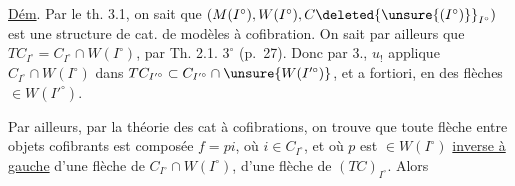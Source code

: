 
\uline{Dém}. Par le th. 3.1, on sait que $(M(I^\circ),W(I^\circ),C\deleted{\unsure{(I^\circ)}}_{I^\circ})$ est une structure de cat. de modèles à cofibration. On sait par ailleurs que $TC_{I^\circ}=C_{I^\circ}\cap W(I^\circ)$, par Th. 2.1. $3^\circ$ (p.~27). Donc par 3., $u_!$ applique $C_{I^\circ}\cap W(I^\circ)$ dans $TC_{I'^\circ}\subset C_{I'^\circ}\cap\unsure{W(I'^\circ)}$, et a fortiori, en des flèches $\in W(I'^\circ)$.

Par ailleurs, par la théorie des cat à cofibrations, on trouve que toute flèche   entre objets cofibrants est composée $f=pi$, où $i\in C_{I^\circ}$, et  où $p$ est $\in W(I^\circ)$  \uline{inverse à gauche} d'une flèche de $C_{I^\circ}\cap W(I^\circ)$,  d'une flèche de $(TC)_{I^\circ}$. Alors
